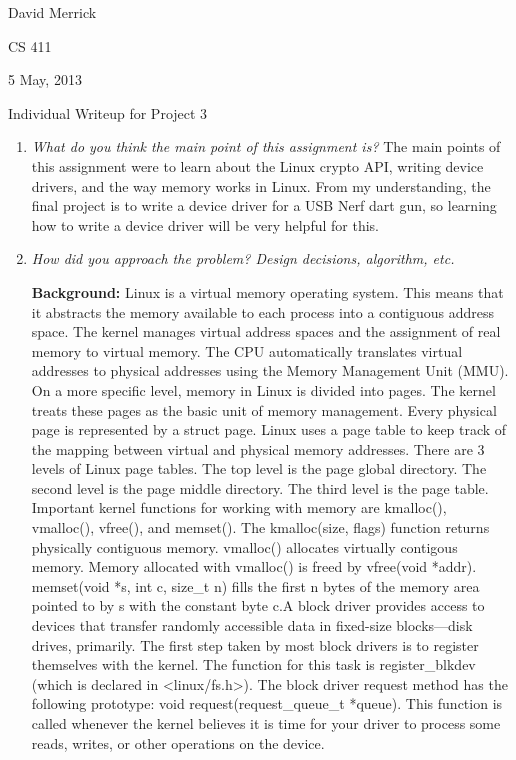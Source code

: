 \documentclass[letterpaper,10pt,titlepage]{article}
\newcommand{\ignore}[2]{\hspace{0in}#2} %
\newcommand{\tab}{\hspace*{2em}} %
\def\name{David Merrick}
\def\project{Project 3}
\def\date{5 May, 2013}
\begin{document}
\name

CS 411

\date

\begin{center}
{\LARGE Individual Writeup for \project}
\end{center}

\begin{enumerate} 
\item \emph{What do you think the main point of this assignment is?}
The main points of this assignment were to learn about the Linux crypto API, writing device drivers, and the way memory works in Linux. From my understanding, the final project is to write a device driver for a USB Nerf dart gun, so learning how to write a device driver will be very helpful for this.

\item \emph{How did you approach the problem? Design decisions, algorithm, etc.}

\tab \textbf{Background:} 
\tab Linux is a virtual memory operating system. This means that it abstracts the memory available to each process into a contiguous address space. The kernel manages virtual address spaces and the assignment of real memory to virtual memory. The CPU automatically translates virtual addresses to physical addresses using the Memory Management Unit (MMU)\ignore{source:http://en.wikipedia.org/wiki/Virtual_memory}. On a more specific level, memory in Linux is divided into pages. The kernel treats these pages as the basic unit of memory management\ignore{source:Love pg. 231}. Every physical page is represented by a struct page. Linux uses a page table to keep track of the mapping between virtual and physical memory addresses. There are 3 levels of Linux page tables. The top level is the page global directory. The second level is the page middle directory. The third level is the page table. Important kernel functions for working with memory are kmalloc(), vmalloc(), vfree(), and memset(). The kmalloc(size, flags) function returns physically contiguous memory. vmalloc() allocates virtually contigous memory. Memory allocated with vmalloc() is freed by vfree(void *addr). memset(void *s, int c, size\_t n) fills the first n bytes of the memory area pointed to by s with the constant byte c.\ignore{source: http://linux.die.net/man/3/memset}

\tab A block driver provides access to devices that transfer randomly accessible data in fixed-size blocks—disk drives, primarily. The first step taken by most block drivers is to register themselves with the kernel. The function for this task is register\_blkdev (which is declared in <linux/fs.h>). The block driver request method has the following prototype: void request(request_queue_t *queue). This function is called whenever the kernel believes it is time for your driver to process some reads, writes, or other operations on the device\ignore{source: http://lwn.net/images/pdf/LDD3/ch16.pdf}. 


\end{enumerate}
\end{document}
